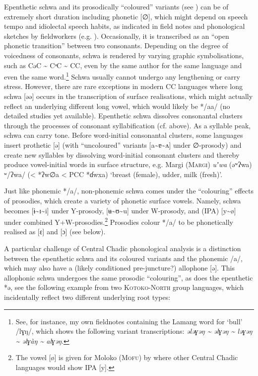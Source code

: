 \documentclass[output=paper]{langscibook}
\begin{document}
Epenthetic schwa and its prosodically ``coloured'' variants (see ) can be of extremely short duration including phonetic [∅], which might depend on speech tempo and idiolectal speech habits, as indicated in field notes and phonological sketches by fieldworkers (e.g. \citealt{Frick1977, Wolff1983a}). Occasionally, it is transcribed as an ``open phonetic transition'' between two consonants. Depending on the degree of voicedness of consonants, schwa is rendered by varying graphic symbolisations, such as CəC {\textasciitilde} CᵊC {\textasciitilde} CC, even by the same author for the same language and even the same word.\footnote{\textrm{See, for instance, my own fieldnotes containing the Lamang word for `bull' /lɣŋ/, which shows the following variant transcriptions: \textit{ələɣəŋ {\textasciitilde} əlɣəŋ {\textasciitilde} ləɣəŋ {\textasciitilde} əlɣàŋ {\textasciitilde} alɣəŋ}}.} Schwa usually cannot undergo any lengthening or carry stress. However, there are rare exceptions in modern CC languages where long schwa [əə] occurs in the transcription of surface realisations, which might actually reflect an underlying different long vowel, which would likely be */aa/ (no detailed studies yet available). Epenthetic schwa dissolves consonantal clusters through the processes of consonant syllabification (cf. above). As a syllable peak, schwa can carry tone. Before word-initial consonantal clusters, some languages insert prothetic [ə] (with ``uncoloured'' variants [a{\textasciitilde}ɐ{\textasciitilde}ʌ] under ∅-prosody) and create new syllables by dissolving word-initial consonant clusters and thereby produce vowel-initial words in surface structure, e.g. Margi (\textsc{Margi}) \textit{uʼwa}  (əʷʔwa) ʷ/ʔwa/ (< *ʔw∅a < PCC *ɗwxa) ‘breast (female), udder, milk (fresh)’.

Just like phonemic */a/, non-phonemic schwa comes under the ``colouring'' effects of prosodies, which create a variety of phonetic surface vowels. Namely, schwa becomes [ɨ{\textasciitilde}ɪ{\textasciitilde}i] under Y-prosody, [ʉ{\textasciitilde}ʊ{\textasciitilde}u] under W-prosody, and (IPA) [y{\textasciitilde}ø] under combined Y+W-prosodies.\footnote{\textrm{The vowel [ø] is given for Moloko (}\textrm{\textsc{Mofu}}\textrm{) by \citet{FriesenEtAl2017} where other Central Chadic languages would show IPA [y].}} Prosodies colour */a/ to be phonetically realised as [ε] and [ɔ] (see  below).

A particular challenge of Central Chadic phonological analysis is a distinction between the epenthetic schwa and its coloured variants and the phonemic /a/, which may also have a (likely conditioned pre-juncture?) allophone [ə]. This allophonic schwa undergoes the same prosodic ``colouring'', as does the epenthetic *ə, see the following example from two \textsc{Kotoko-North} group languages, which incidentally reflect two different underlying root types:
\end{document}

